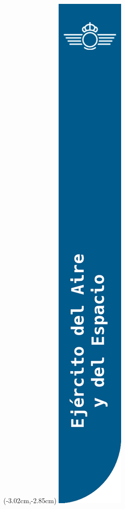 
\begin{titlepage}

\thispagestyle{empty}

\begin{textblock*}{\paperheight}(-3.02cm,-2.85cm)
    \includegraphics [height=\paperheight]{img/Portada.png}
\end{textblock*}


\end{titlepage}
